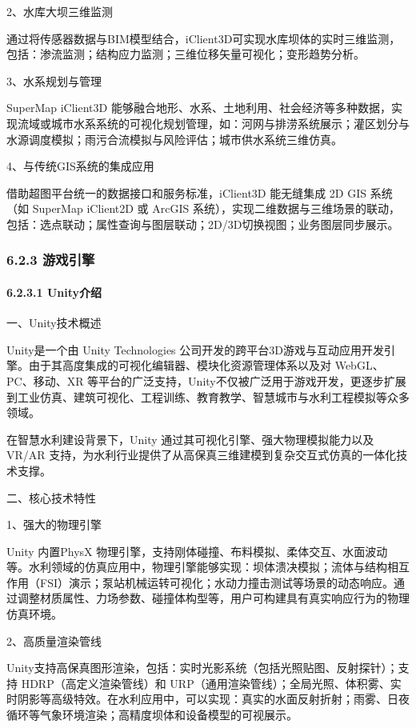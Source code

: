 2、水库大坝三维监测

通过将传感器数据与BIM模型结合，iClient3D可实现水库坝体的实时三维监测，包括：渗流监测；结构应力监测；三维位移矢量可视化；变形趋势分析。

3、水系规划与管理

SuperMap iClient3D 能够融合地形、水系、土地利用、社会经济等多种数据，实现流域或城市水系系统的可视化规划管理，如：河网与排涝系统展示；灌区划分与水源调度模拟；雨污合流模拟与风险评估；城市供水系统三维仿真。

4、与传统GIS系统的集成应用

借助超图平台统一的数据接口和服务标准，iClient3D 能无缝集成 2D GIS 系统（如 SuperMap iClient2D 或 ArcGIS 系统），实现二维数据与三维场景的联动，包括：选点联动；属性查询与图层联动；2D/3D切换视图；业务图层同步展示。

\subsubsection{6.2.3 游戏引擎}\label{ux6e38ux620fux5f15ux64ce}

\paragraph{6.2.3.1 Unity介绍}\label{unityux4ecbux7ecd}

一、Unity技术概述

Unity是一个由 Unity Technologies 公司开发的跨平台3D游戏与互动应用开发引擎。由于其高度集成的可视化编辑器、模块化资源管理体系以及对 WebGL、PC、移动、XR 等平台的广泛支持，Unity不仅被广泛用于游戏开发，更逐步扩展到工业仿真、建筑可视化、工程训练、教育教学、智慧城市与水利工程模拟等众多领域。

在智慧水利建设背景下，Unity 通过其可视化引擎、强大物理模拟能力以及 VR/AR 支持，为水利行业提供了从高保真三维建模到复杂交互式仿真的一体化技术支撑。

二、核心技术特性

1、强大的物理引擎

Unity 内置PhysX 物理引擎，支持刚体碰撞、布料模拟、柔体交互、水面波动等。水利领域的仿真应用中，物理引擎能够实现：坝体溃决模拟；流体与结构相互作用（FSI）演示；泵站机械运转可视化；水动力撞击测试等场景的动态响应。通过调整材质属性、力场参数、碰撞体构型等，用户可构建具有真实响应行为的物理仿真环境。

2、高质量渲染管线

Unity支持高保真图形渲染，包括：实时光影系统（包括光照贴图、反射探针）；支持 HDRP（高定义渲染管线）和 URP（通用渲染管线）；全局光照、体积雾、实时阴影等高级特效。在水利应用中，可以实现：真实的水面反射折射；雨雾、日夜循环等气象环境渲染；高精度坝体和设备模型的可视展示。

